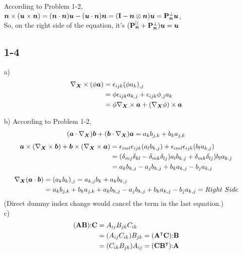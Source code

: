 According to Problem 1-2, $ \bm{n} \times (\bm{u} \times \bm{n} ) = (\bm{n}\cdot \bm{n})\bm{u}-(\bm{u}\cdot\bm{n})\bm{n} =(\mathbf{I} - \bm{n} \otimes \bm{n}) \bm{u} = \mathbf{P}_{\bm{n}}^{\perp} \bm{u} $, \\
So, on the right side of the equation, it's $(\mathbf{P}_{\bm{n}}^{||}+\mathbf{P}_{\bm{n}}^{\perp})\bm{u} = \bm{u}$


\subsection*{1-4}
a)
\begin{align*}
    \nabla_{\bm{X}} \times (\phi \bm{a}) &= \epsilon_{ijk}(\phi a_k)_{,j} \\
    &= \phi \epsilon_{ijk} a_{k,j} + \epsilon_{ijk} \phi_{,j}a_k \\
    &= \phi \nabla_{\bm{X}} \times \bm{a} + (\nabla_{\bm{X}}\phi) \times \bm{a}
\end{align*}

b)
According to Problem 1-2, 
\begin{align*}
    (\bm{a} \cdot \nabla_{\bm{X}}) \bm{b} + (\bm{b} \cdot \nabla_{\bm{X}}) \bm{a}=a_k b_{j,k} +b_k a_{j,k}
\end{align*}    
\begin{align*}
    \bm{a} \times (\nabla_{\bm{X}} \times \bm{b}) + \bm{b} \times (\nabla_{\bm{X}} \times \bm{a}) &= \epsilon_{iml}\epsilon_{ijk}(a_l b_{k,j}) + \epsilon_{iml}\epsilon_{ijk}(b_l a_{k,j}) \\
    &= (\delta_{mj}\delta_{kl}-\delta_{mk}\delta_{lj})a_l b_{k.j} +  \delta_{mk}\delta_{lj})b_l a_{k.j}  \\
    &= a_kb_{k,j} - a_j b_{k,j} + b_k a_{k,j} - b_j a_{k,j}
\end{align*}
\begin{align*}
    \nabla_{\bm{X}} (\bm{a} \cdot \bm{b})  &= (a_k b_k)_{,j}=a_{k,j}b_k + a_k b_{k,j} \\
    &= a_k b_{j,k} +b_k a_{j,k}+a_kb_{k,j} - a_j b_{k,j} + b_k a_{k,j} - b_j a_{k,j} = Right \ Side
\end{align*}
(Direct dummy index change would cancel the term in the last equation.)\\

c)
\begin{align*}
    (\mathbf{A} \mathbf{B}) \mathbf{:} \mathbf{C} &=A_{ij}B_{jk}C_{ik} \\
    &= (A_{ij}C_{ik})B_{jk} = (\mathbf{A}^\intercal \mathbf{C})\mathbf{:} \mathbf{B}\\
    &=(C_{ik}B_{jk})A_{ij}= (\mathbf{C} \mathbf{B}^\intercal)\mathbf{:} \mathbf{A}
\end{align*}

